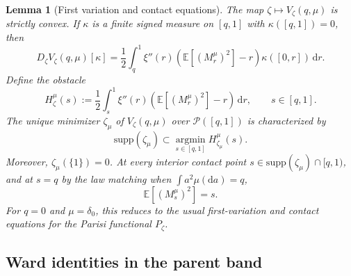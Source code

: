 \documentclass[a4paper,10pt,reqno]{amsart}
\numberwithin{equation}{section}
\newtheorem{lemma}[proposition]{Lemma}%
\newcommand{\dE}{\mathbb{E}}%
\newcommand{\supp}{\mathrm{supp}}
\newcommand{\mc}{\mathcal}
\newcommand{\dd}{\mathrm{d}}
\begin{document}
	\begin{lemma}[First variation and contact equations]\label{lem:first-variation-contact}
		The map $\zeta\mapsto V_\zeta(q,\mu)$ is strictly convex.  If $\kappa$ is a finite signed measure on $[q,1]$ with $\kappa([q,1])=0$, then
		\begin{equation}\label{eq:TAP-first-variation}
			D_\zeta V_\zeta(q,\mu)[\kappa]
			=\frac12\int_q^1\xi''(r)
			\left(\dE[(M_r^\mu)^2]-r\right)
			\kappa([0,r])\,\dd r .
		\end{equation}
		Define the obstacle
		\begin{equation}\label{eq:TAP-obstacle}
			H_\zeta^\mu(s)
			:=\frac12\int_s^1\xi''(r)
			\left(\dE[(M_r^\mu)^2]-r\right)\,\dd r,
			\qquad s\in[q,1].
		\end{equation}
		The unique minimizer $\zeta_\mu$ of $V_\zeta(q,\mu)$ over $\mc P([q,1])$ is characterized by
		\begin{equation}\label{eq:TAP-support-obstacle}
			\supp(\zeta_\mu)
			\subset
			\operatorname*{argmin}_{s\in[q,1]}H_{\zeta_\mu}^\mu(s).
		\end{equation}
		Moreover, $\zeta_\mu(\{1\})=0$. At every interior contact point
		$s\in\supp(\zeta_\mu)\cap[q,1)$, and at $s=q$ by the law matching when
		$\int a^2\mu(\dd a)=q$,
		\begin{equation}\label{eq:TAP-contact-calibration}
			\dE[(M_s^\mu)^2]=s .
		\end{equation}
		For $q=0$ and $\mu=\delta_0$, this reduces to the usual first-variation and contact equations for the Parisi functional $P_\zeta$.
	\end{lemma}
	
	\subsection{Ward identities in the parent band}
	
\end{document}
